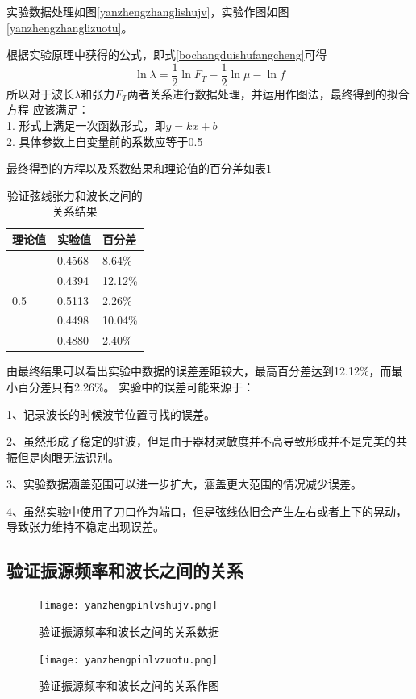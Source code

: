 \documentclass{ctexart}
\begin{document}
  实验数据处理如图\ref{yanzhengzhanglishujv}，实验作图如图\ref{yanzhengzhanglizuotu}。

  根据实验原理中获得的公式，即式\ref{bochangduishufangcheng}可得
  $$\ln \lambda = \frac{1}{2} \ln F_{T}-\frac{1}{2} \ln \mu - \ln f$$
  所以对于波长$\lambda$和张力$F_{T}$两者关系进行数据处理，并运用作图法，最终得到的拟合方程
  应该满足：\\
  1. 形式上满足一次函数形式，即$y=kx+b$\\
  2. 具体参数上自变量前的系数应等于0.5

  最终得到的方程以及系数结果和理论值的百分差如表\ref{yanzhengzhanglibaifencha}
  \begin{table}[h]
    \centering   
    \caption{验证弦线张力和波长之间的关系结果}\label{yanzhengzhanglibaifencha}
    \begin{tabular}{| l || l || l |}
        \hline
        理论值 & 实验值 & 百分差\\
        \hline
        \multirow{5}{*}{0.5} & 0.4568 & 8.64\% \\
        \cline{2-3}
        & 0.4394 & 12.12\% \\
        \cline{2-3}
        & 0.5113 & 2.26\% \\
        \cline{2-3}
        & 0.4498 & 10.04\% \\
        \cline{2-3}
        & 0.4880 & 2.40\% \\
        \hline                   
    \end{tabular}
  \end{table}

  由最终结果可以看出实验中数据的误差差距较大，最高百分差达到12.12\%，而最小百分差只有2.26\%。
  实验中的误差可能来源于：

  1、记录波长的时候波节位置寻找的误差。

  2、虽然形成了稳定的驻波，但是由于器材灵敏度并不高导致形成并不是完美的共振但是肉眼无法识别。

  3、实验数据涵盖范围可以进一步扩大，涵盖更大范围的情况减少误差。

  4、虽然实验中使用了刀口作为端口，但是弦线依旧会产生左右或者上下的晃动，导致张力维持不稳定出现误差。

  \subsection{验证振源频率和波长之间的关系}
  \begin{figure}[b]
    \centering
    \begin{minipage}[b]{0.48\textwidth}
      \centering
      \texttt{[image: yanzhengpinlvshujv.png]}
      \caption{验证振源频率和波长之间的关系数据}\label{yanzhengpinlvshujv}
    \end{minipage}
    \begin{minipage}[b]{0.48\textwidth}
      \centering
      \texttt{[image: yanzhengpinlvzuotu.png]}
      \caption{验证振源频率和波长之间的关系作图}\label{yanzhengpinlvzuotu}
    \end{minipage}
  \end{figure}
\end{document}
